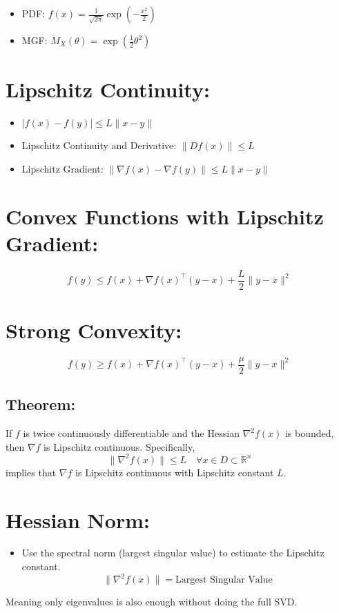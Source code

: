\documentclass{article}
\begin{document}
\begin{itemize}
    \item PDF: $f(x) = \frac{1}{\sqrt{2\pi}} \exp\left(-\frac{x^2}{2}\right)$
    \item MGF: $M_X(\theta) = \exp\left(\frac{1}{2} \theta^2\right)$
\end{itemize}

\section*{Lipschitz Continuity:}
\begin{itemize}
    \item $|f(x) - f(y)| \leq L\|x - y\|$
    \item Lipschitz Continuity and Derivative: $\|Df(x)\| \leq L$
    \item Lipschitz Gradient: $\|\nabla f(x) - \nabla f(y)\| \leq L\|x - y\|$
\end{itemize}

\section*{Convex Functions with Lipschitz Gradient:}
$$f(y) \leq f(x) + \nabla f(x)^\top (y - x) + \frac{L}{2} \|y - x\|^2$$

\section*{Strong Convexity:}
$$f(y) \geq f(x) + \nabla f(x)^\top (y - x) + \frac{\mu}{2} \|y - x\|^2$$

\subsection*{Theorem:}
If $f$ is twice continuously differentiable and the Hessian $\nabla^2 f(x)$ is bounded, then $\nabla f$ is Lipschitz continuous. Specifically,
$$\|\nabla^2 f(x)\| \leq L \quad \forall x \in D \subset \mathbb{R}^n$$
implies that $\nabla f$ is Lipschitz continuous with Lipschitz constant $L$.




\section*{Hessian Norm:}
\begin{itemize}
    \item Use the spectral norm (largest singular value) to estimate the Lipschitz constant.
    \[
    \|\nabla^2 f(x)\| = \text{Largest Singular Value}
    \]
\end{itemize}
Meaning only eigenvalues is also enough without doing the full SVD.
\end{document}
